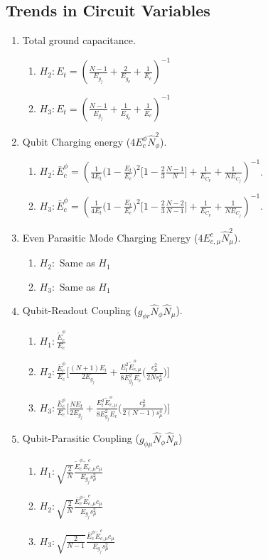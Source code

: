 \documentclass[%
reprint,
superscriptaddress,
 amsmath,amssymb,
 aps,
 prx,
longbibliography,
floatfix,
]{revtex4-2}
\begin{document}
\subsection{Trends in Circuit Variables}
\begin{enumerate}
    \item Total ground capacitance.
    \begin{enumerate}
        \item $H_2: E_t=(\frac{N-1}{E_{g_j}}+\frac{2}{E_{g_p}}+\frac{1}{E_c})^{-1}$
    \item $H_3: E_t=(\frac{N-1}{E_{g_j}}+\frac{1}{E_{g_p}}+\frac{1}{E_c})^{-1}$
    \end{enumerate}
\item Qubit Charging energy ($4E_c^\phi \hat N_{\phi}^2$). 
    \begin{enumerate}
    \item $H_2: \bar{E}_c^\phi=(\frac{1}{4E_t}\Big(1-\frac{E_t}{E_c}\Big)^2\Big[1-\frac{2}{3}\frac{N-1}{N}\Big]+\frac{1}{E_{C_p}}+\frac{1}{NE_{C_j}})^{-1}$. 
    \item  $H_3: \bar{E}_c^\phi=(\frac{1}{4E_t}\Big(1-\frac{E_t}{E_c}\Big)^2\Big[1-\frac{2}{3}\frac{N-2}{N-1}\Big]+\frac{1}{E_{C_p}}+\frac{1}{NE_{C_j}})^{-1}$.
    \end{enumerate}
    
\item Even Parasitic Mode Charging Energy  ($4E_{c,\mu}^e \hat N_{\mu}^2$). 
    \begin{enumerate}
    \item $H_2:$ Same as $H_1$
    \item $H_3:$ Same as $H_1$
\end{enumerate}
     \item Qubit-Readout Coupling ($g_{\phi r}\hat N_\phi \hat N_\mu$).
    \begin{enumerate}
        \item $H_1: \frac{\tilde{E}_c^\phi}{E_c}$
        \item $H_2:\frac{\bar{E}_c^\phi}{E_c} \Big[\frac{(N+1)E_t}{2E_{g_j}}+\frac{E_t^2\tilde{E}_{c,\mu}^o}{8E_{g_j}^2E_c} \Big(\frac{c_\mu^2}{2Ns_\mu^4}\Big)\Big]$
        \item $H_3:\frac{\bar{E}_c^\phi}{E_c} \Big[\frac{NE_t}{2E_{g_j}}+\frac{E_t^2\tilde{E}_{c,\mu}^o}{8E_{g_j}^2E_c} \Big(\frac{c_\mu^2}{2(N-1)s_\mu^4}\Big)\Big]$
    \end{enumerate}
\item Qubit-Parasitic Coupling ($g_{\phi\mu}\hat N_\phi \hat N_\mu$)    
    \begin{enumerate}
        \item $H_1: \sqrt{\frac{2}{N}} \frac{\tilde{E}^\phi_c\tilde{E}^e_{c,\mu}c_\mu}{E_{g_j}s_\mu^2}$
        \item $H_2:\sqrt{\frac{2}{N}} \frac{\bar{E}^\phi_c\tilde{E}^{e}_{c,\mu}c_\mu}{E_{g_j}s_\mu^2}$
        \item $H_3:\sqrt{\frac{2}{N-1}} \frac{\bar{E}^\phi_c\tilde{E}^{e}_{c,\mu}c_\mu}{E_{g_j}s_\mu^2}$
    \end{enumerate}


\end{enumerate}
\end{document}
